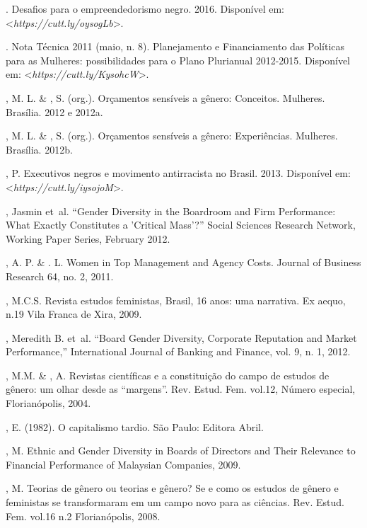 \begin{Parskip}
. Desafios para o empreendedorismo negro. 2016.
Disponível em: \textless{}\emph{https://cutt.ly/oysogLb}\textgreater{}.

. Nota Técnica  2011 (maio, n. 8). Planejamento e Financiamento
das Políticas para as Mulheres: possibilidades para o Plano Plurianual
2012-2015.
Disponível em: \textless{}\emph{https://cutt.ly/KysohcW}\textgreater{}.

, M. L. \& , S. (org.). Orçamentos sensíveis a gênero:
Conceitos.  Mulheres. Brasília. 2012 e 2012a.

, M. L. \& , S. (org.). Orçamentos sensíveis a gênero:
Experiências.  Mulheres. Brasília. 2012b.

, P. Executivos negros e movimento antirracista no Brasil. 2013.
Disponível em: \textless{}\emph{https://cutt.ly/iysojoM}\textgreater{}.

, Jasmin et~al. ``Gender Diversity in the Boardroom and Firm
Performance: What Exactly Constitutes a 'Critical Mass'?'' Social
Sciences Research Network, Working Paper Series, February 2012.

, A. P. \& . L. Women in Top Management and Agency Costs.
Journal of Business Research 64, no. 2, 2011.

, M.C.S. Revista estudos feministas, Brasil, 16 anos: uma narrativa.
Ex aequo, n.19 Vila Franca de Xira, 2009.

, Meredith B. et~al. ``Board Gender Diversity, Corporate
Reputation and Market Performance,'' International Journal of Banking
and Finance, vol. 9, n. 1, 2012.

, M.M. \& , A. Revistas científicas e a constituição do
campo de estudos de gênero: um olhar desde as ``margens''. Rev. Estud.
Fem. vol.12, Número especial, Florianópolis, 2004.

, E. (1982). O capitalismo tardio. São Paulo: Editora Abril.

, M. Ethnic and Gender Diversity in Boards of Directors and
Their Relevance to Financial Performance of Malaysian Companies, 2009.

, M. Teorias de gênero ou teorias e gênero? Se e como os estudos de
gênero e feministas se transformaram em um campo novo para as ciências.
Rev. Estud. Fem. vol.16 n.2 Florianópolis, 2008.


\end{Parskip}
